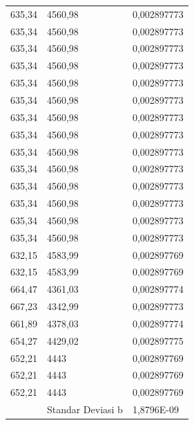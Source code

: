 \begin{center}
\begin{longtable}{|l|l|l|}
635,34            & 4560,98           & 0,002897773 \\
635,34            & 4560,98           & 0,002897773 \\
635,34            & 4560,98           & 0,002897773 \\
635,34            & 4560,98           & 0,002897773 \\
635,34            & 4560,98           & 0,002897773 \\
635,34            & 4560,98           & 0,002897773 \\
635,34            & 4560,98           & 0,002897773 \\
635,34            & 4560,98           & 0,002897773 \\
635,34            & 4560,98           & 0,002897773 \\
635,34            & 4560,98           & 0,002897773 \\
635,34            & 4560,98           & 0,002897773 \\
635,34            & 4560,98           & 0,002897773 \\
635,34            & 4560,98           & 0,002897773 \\
635,34            & 4560,98           & 0,002897773 \\
632,15            & 4583,99           & 0,002897769 \\
632,15            & 4583,99           & 0,002897769 \\
664,47            & 4361,03           & 0,002897774 \\
667,23            & 4342,99           & 0,002897773 \\
661,89            & 4378,03           & 0,002897774 \\
654,27            & 4429,02           & 0,002897775 \\
652,21            & 4443              & 0,002897769 \\
652,21            & 4443              & 0,002897769 \\
652,21            & 4443              & 0,002897769 \\
                  & Standar Deviasi b & 1,8796E-09  \\      
\end{longtable}
\end{center}

